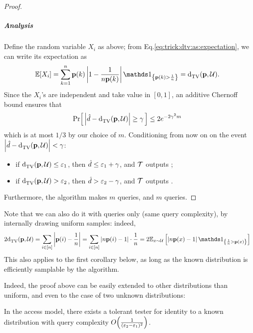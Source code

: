 \begin{proof}
  \subparagraph{Analysis} Define the random variable $X_i$ as above; from Eq.\eqref{eq:trick:dtv:as:expectation}, we can write its expectation as
    \begin{equation}
    \expect{ X_i } = \sum_{k=1}^n \D(k)\abs{1-\frac{1}{n \D(k)}}\indic{\D(k)> \frac{1}{n}} = \totalvardist{\D}{\uniform}.
    \end{equation}
    Since the $X_i$'s are independent and take value in $[0,1]$, an additive Chernoff bound ensures that
    \begin{equation}\label{eq:chernoff:dhat}
      \Pr\!\left[\,  \left\lvert \hat{d} - {\operatorname{d}_{\textrm{TV}}^{}\!\left({\mathbf{p}, \mathcal{U}}\right)} \right\rvert \geq \gamma  \, \right] \leq 2e^{-2\gamma^2 m}
    \end{equation}
    which is at most $1/3$ by our choice of $m$. Conditioning from now on on the event {$\left\lvert \hat{d} - {\operatorname{d}_{\textrm{TV}}^{}\!\left({\mathbf{p}, \mathcal{U}}\right)}  \right\rvert < \gamma$}:
    \begin{itemize}
      \item if ${\operatorname{d}_{\textrm{TV}}^{}\!\left({\mathbf{p}, \mathcal{U}}\right)}\leq \varepsilon_1$, then $\hat{d}\leq \varepsilon_1+\gamma$, and $\mathcal{T}$ outputs \accept;
      \item if ${\operatorname{d}_{\textrm{TV}}^{}\!\left({\mathbf{p}, \mathcal{U}}\right)} > \varepsilon_2$, then $\hat{d} > \varepsilon_2-\gamma$, and $\mathcal{T}$ outputs \reject.
    \end{itemize}
    Furthermore, the algorithm makes $m$ \SAMP queries, and $m$ \EVAL queries.
\end{proof}

\begin{remark}\label{remark:tolerant:tester:uniform:only:eval}
  Note that we can also do it with \EVAL queries only (same query complexity), by internally drawing uniform samples: indeed,
  \[
  2\totalvardist{\D}{\uniform} = \sum_{i\in[n]} \abs{\D(i)-\frac{1}{n}} = \sum_{i\in[n]} \abs{n\D(i)-1}\cdot \frac{1}{n} = 2\shortexpect_{x\sim \uniform}\left[ \abs{n\D(x)-1}\indic{\frac{1}{n} > \D(x)} \right]
  \]
  This also applies to the first corollary below, as long as the known distribution is efficiently samplable by the algorithm.
\end{remark}
Indeed, the proof above can be easily extended to other distributions than uniform, and even to the case of two unknown distributions:
\begin{corollary}\label{coro:tolerant:tester:known:d}
In the \pdfsamp access model, there exists a tolerant tester for identity to a known distribution with query complexity $\bigO{\frac{1}{(\eps_2-\eps_1)^2}}$.\end{corollary}

